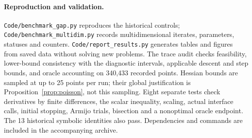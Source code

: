 \paragraph{Reproduction and validation.}
\texttt{Code/benchmark\_gap.py} reproduces the historical controls;
\texttt{Code/benchmark\_multidim.py} records multidimensional iterates,
parameters, statuses and counters.
\texttt{Code/report\_results.py} generates tables and figures from saved
data without solving new problems.
The trace audit checks feasibility, lower-bound consistency with the
diagnostic intervals, applicable descent and step bounds, and oracle
accounting on 340,433 recorded points. Hessian bounds are sampled at
up to 25 points per run; their global justification is
Proposition~\ref{prop:poisson}, not this sampling.
Eight separate tests check derivatives by finite differences, the scalar
inequality, scaling, actual interface calls, initial stopping, Armijo
trials, bisection and a nonoptimal oracle endpoint.
The 13 historical symbolic identities also pass.
Dependencies and commands are included in the accompanying archive.
